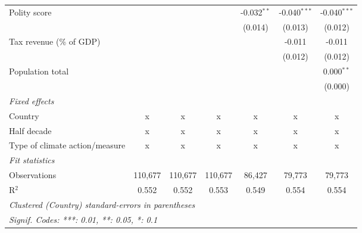 \begin{tabular}{lcccccc}
   Polity score                                                             &         &                &                & -0.032$^{**}$  & -0.040$^{***}$ & -0.040$^{***}$\\   
                                                                            &         &                &                & (0.014)        & (0.013)        & (0.012)\\   
   Tax revenue (\% of GDP)                                                  &         &                &                &                & -0.011         & -0.011\\   
                                                                            &         &                &                &                & (0.012)        & (0.012)\\   
   Population total                                                         &         &                &                &                &                & 0.000$^{**}$\\   
                                                                            &         &                &                &                &                & (0.000)\\   
   \emph{Fixed effects}\\
   Country                                                                  & x       & x              & x              & x              & x              & x\\  
   Half decade                                                              & x       & x              & x              & x              & x              & x\\  
   Type of climate action/measure                                           & x       & x              & x              & x              & x              & x\\  
   \midrule \emph{Fit statistics}\\
   Observations                                                             & 110,677 & 110,677        & 110,677        & 86,427         & 79,773         & 79,773\\  
   R$^2$                                                                    & 0.552   & 0.552          & 0.553          & 0.549          & 0.554          & 0.554\\  
   \midrule
   \multicolumn{7}{l}{\emph{Clustered (Country) standard-errors in parentheses}}\\
   \multicolumn{7}{l}{\emph{Signif. Codes: ***: 0.01, **: 0.05, *: 0.1}}\\
\end{tabular}
\par\endgroup


